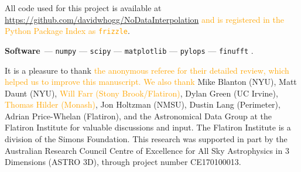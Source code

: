 \documentclass[modern, linenumbers]{aastex631}
\renewcommand{\paragraph}[1]{\medskip\par\noindent\textbf{#1}~---}
\newcommand{\modified}[1]{\textcolor{orange}{#1}}
\begin{document}
All code used for this project is available at \url{https://github.com/davidwhogg/NoDataInterpolation} \modified{and is registered in the Python Package Index as \texttt{frizzle}}.

\paragraph{Software}
\texttt{numpy} \citep{numpy} ---
\texttt{scipy} \citep{scipy} ---
\texttt{matplotlib} \citep{matplotlib} ---
\texttt{pylops} \citep{pylops} ---
\texttt{finufft} \citep{finufft}.

\begin{acknowledgments}
It is a pleasure to thank \modified{the anonymous referee for their detailed review, which helped us to improve this manuscript. We also thank}
    Mike Blanton (NYU),
    Matt Daunt (NYU),
    \modified{Will Farr (Stony Brook/Flatiron)},
    Dylan Green (UC Irvine),
    \modified{Thomas Hilder (Monash)},
    Jon Holtzman (NMSU), 
    Dustin Lang (Perimeter),
    Adrian Price-Whelan (Flatiron),
and the Astronomical Data Group at the Flatiron Institute
for valuable discussions and input.
The Flatiron Institute is a division of the Simons Foundation.
This research was supported in part by the Australian Research Council Centre of Excellence for All Sky Astrophysics in 3 Dimensions (ASTRO 3D), through project number CE170100013.
\end{acknowledgments}
\end{document}
